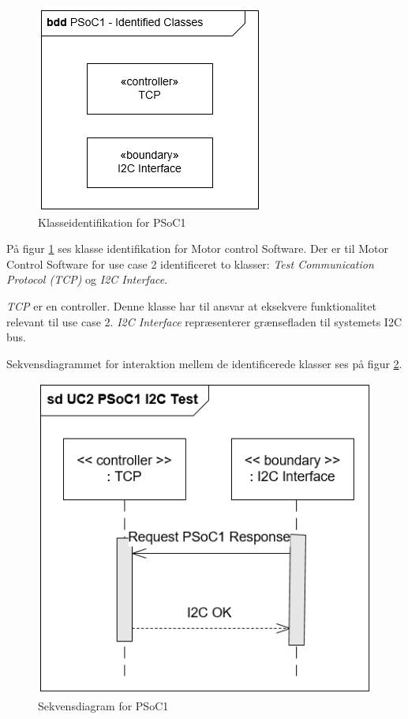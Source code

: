\begin{figure}[H]
	\centering
	\includegraphics[scale=0.8]{Systemarkitektur/images/KlasseIdentifikationPSoC1.png}
	\caption{Klasseidentifikation for PSoC1}
	\label{fig:klasseidentifikationPSoC1}
\end{figure}

På figur \ref{fig:klasseidentifikationPSoC1} ses klasse identifikation for Motor control Software. Der er til Motor Control Software for use case 2 identificeret to klasser: 
\textit{Test Communication Protocol (TCP)} og \textit{I2C Interface}.

\textit{TCP} er en controller. Denne klasse har til ansvar at eksekvere funktionalitet relevant til use case 2. \textit{I2C Interface} repræsenterer grænsefladen til systemets I2C bus.

Sekvensdiagrammet for interaktion mellem de identificerede klasser ses på figur \ref{fig:sekvensPSoC1I2CTest}.

\begin{figure}[H]
	\centering
	\includegraphics[width=.8\textwidth] {Systemarkitektur/images/SDPSoC1I2CTest}
	\caption{Sekvensdiagram for PSoC1}
	\label{fig:sekvensPSoC1I2CTest}
\end{figure}

